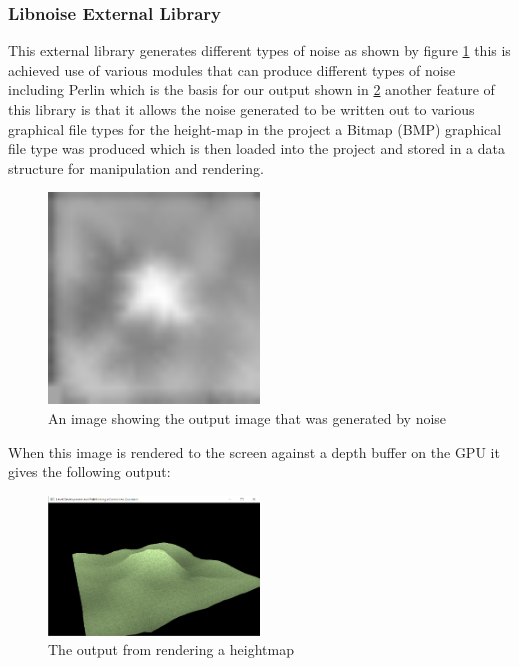 \documentclass[12pt,a4paper]{article}
\begin{document}
\subsubsection{Libnoise External Library}
This external library generates different types of noise as shown by figure \ref{noise} this is achieved use of various modules that can produce different types of noise including Perlin which is the basis for our output shown in \ref{heightmap} another feature of this library is that it allows the noise generated to be written out to various graphical file types for the height-map in the project a Bitmap (BMP) graphical file type was produced which is then loaded into the project and stored in a data structure for manipulation and rendering.\\
\begin{figure}[ht!]
	\includegraphics[width=0.5\textwidth]{images/heightmaptest}
	\caption{An image showing the output image that was generated by noise}	 \label{noise}
\end{figure}

\pagebreak
When this image is rendered to the screen against a depth buffer on the GPU it gives the following output:
\begin{figure}[ht!]
	\includegraphics[width=0.5\textwidth]{images/Heightmap-output}
	\caption{The output from rendering a heightmap} \label{heightmap}
\end{figure}
\end{document}
